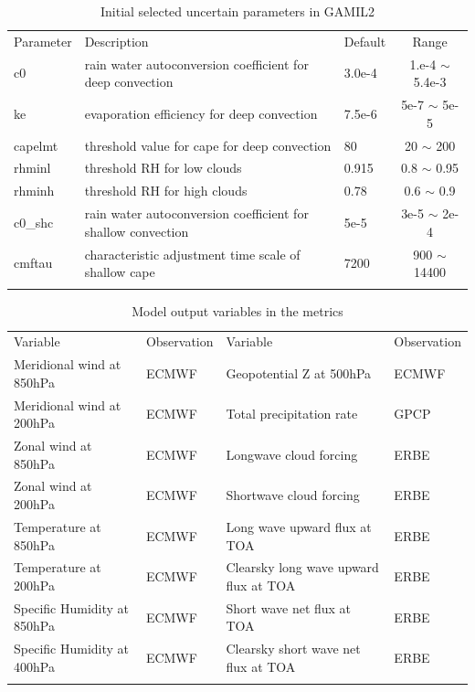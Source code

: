\documentclass[gmd, manuscript]{copernicus}
\begin{document}
\begin{table}[t]
\caption{Initial selected uncertain parameters in GAMIL2}
\begin{tabular}{l l l c}
\tophline
Parameter & Description & Default & Range \\
\middlehline
c0 & rain water autoconversion coefficient for deep convection & 3.0e-4 & 1.e-4 $\sim$ 5.4e-3 \\
ke & evaporation efficiency for deep convection & 7.5e-6 & 5e-7 $\sim$ 5e-5 \\
capelmt & threshold value for cape for deep convection & 80 & 20 $\sim$ 200 \\
rhminl & threshold RH for low clouds & 0.915 & 0.8 $\sim$ 0.95 \\
rhminh & threshold RH for high clouds & 0.78 & 0.6 $\sim$ 0.9 \\
c0\_shc & rain water autoconversion coefficient for shallow convection & 5e-5 & 3e-5 $\sim$ 2e-4 \\
cmftau & characteristic adjustment time scale of shallow cape & 7200 & 900 $\sim$ 14400 \\
\bottomhline
\end{tabular}
\belowtable{} %
\end{table}

\begin{table}[t]
\caption{Model output variables in the metrics}
\begin{tabular}{l l l l}
\tophline
Variable & Observation & Variable & Observation \\
\middlehline
Meridional wind at 850hPa   & ECMWF & Geopotential Z at 500hPa              & ECMWF \\
Meridional wind at 200hPa   & ECMWF & Total precipitation rate              & GPCP \\
Zonal wind at 850hPa        & ECMWF & Longwave cloud forcing                & ERBE \\
Zonal wind at 200hPa        & ECMWF & Shortwave cloud forcing               & ERBE \\
Temperature at 850hPa       & ECMWF & Long wave upward flux at TOA          & ERBE \\
Temperature at 200hPa       & ECMWF & Clearsky long wave upward flux at TOA & ERBE \\
Specific Humidity at 850hPa & ECMWF & Short wave net flux at TOA            & ERBE \\
Specific Humidity at 400hPa & ECMWF & Clearsky short wave net flux at TOA   & ERBE \\
\bottomhline
\end{tabular}
\belowtable{} %
\end{table}
\end{document}
